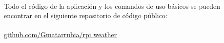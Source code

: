 \paragraph{}Todo el código de la aplicación y los comandos de uso básicos se pueden
encontrar en el siguiente repositorio de código público:

\paragraph{}\href{https://github.com/Gmatarrubia/rpi_weather}{github.com/Gmatarrubia/rpi weather}


